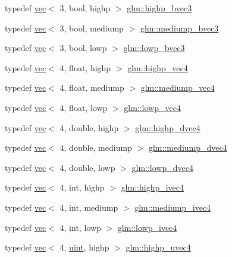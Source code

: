 \begin{DoxyCompactItemize}
\item 
typedef \hyperlink{structglm_1_1vec}{vec}$<$ 3, bool, highp $>$ \hyperlink{group__core__precision_ga0e3365e13160aa93d2a9c68529a013ce}{glm\+::highp\+\_\+bvec3}
\item 
typedef \hyperlink{structglm_1_1vec}{vec}$<$ 3, bool, mediump $>$ \hyperlink{group__core__precision_ga40b0d98c1fef52b1f6f6736c7223e317}{glm\+::mediump\+\_\+bvec3}
\item 
typedef \hyperlink{structglm_1_1vec}{vec}$<$ 3, bool, lowp $>$ \hyperlink{group__core__precision_gad68503417ddfd296669e9af59f3e0d1c}{glm\+::lowp\+\_\+bvec3}
\item 
typedef \hyperlink{structglm_1_1vec}{vec}$<$ 4, float, highp $>$ \hyperlink{group__core__precision_ga27638826fa491205403b39198c49e9f5}{glm\+::highp\+\_\+vec4}
\item 
typedef \hyperlink{structglm_1_1vec}{vec}$<$ 4, float, mediump $>$ \hyperlink{group__core__precision_gaf165f9c36fb7832b79ddf7d56af3c54f}{glm\+::mediump\+\_\+vec4}
\item 
typedef \hyperlink{structglm_1_1vec}{vec}$<$ 4, float, lowp $>$ \hyperlink{group__core__precision_ga9235d8ac062ef68826948ac1df016036}{glm\+::lowp\+\_\+vec4}
\item 
typedef \hyperlink{structglm_1_1vec}{vec}$<$ 4, double, highp $>$ \hyperlink{group__core__precision_ga6e8645fa38f0260e57f1fb7555de0c2f}{glm\+::highp\+\_\+dvec4}
\item 
typedef \hyperlink{structglm_1_1vec}{vec}$<$ 4, double, mediump $>$ \hyperlink{group__core__precision_ga860fd4068c3e89885f814e3b8f312f2f}{glm\+::mediump\+\_\+dvec4}
\item 
typedef \hyperlink{structglm_1_1vec}{vec}$<$ 4, double, lowp $>$ \hyperlink{group__core__precision_gae88de6eaf7152399bdbc2687a76407c4}{glm\+::lowp\+\_\+dvec4}
\item 
typedef \hyperlink{structglm_1_1vec}{vec}$<$ 4, int, highp $>$ \hyperlink{group__core__precision_gaff761e336e3b52f04e725fa85c6d36d1}{glm\+::highp\+\_\+ivec4}
\item 
typedef \hyperlink{structglm_1_1vec}{vec}$<$ 4, int, mediump $>$ \hyperlink{group__core__precision_gada31c3570b58a80e616c7245726a210d}{glm\+::mediump\+\_\+ivec4}
\item 
typedef \hyperlink{structglm_1_1vec}{vec}$<$ 4, int, lowp $>$ \hyperlink{group__core__precision_ga67d57bf0fc189f8153c7c60ad80ec981}{glm\+::lowp\+\_\+ivec4}
\item 
typedef \hyperlink{structglm_1_1vec}{vec}$<$ 4, \hyperlink{group__core__precision_ga4fd29415871152bfb5abd588334147c8}{uint}, highp $>$ \hyperlink{group__core__precision_gae48d6e9a99afc33e6fa51e5d576dfd1a}{glm\+::highp\+\_\+uvec4}

\end{DoxyCompactItemize}
